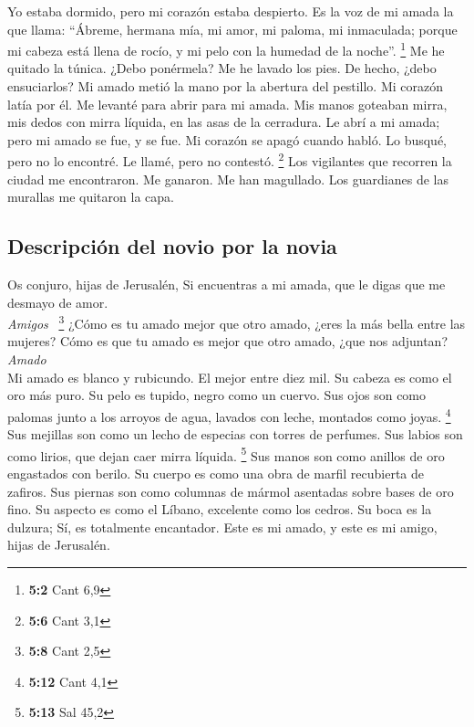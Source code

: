  Yo estaba dormido, pero mi corazón estaba despierto. Es
la voz de mi amada la que llama: ``Ábreme, hermana mía, mi amor, mi
paloma, mi inmaculada; porque mi cabeza está llena de rocío, y mi pelo
con la humedad de la noche''. \footnote{\textbf{5:2} Cant 6,9}
 Me he quitado la túnica. ¿Debo ponérmela? Me he lavado
los pies. De hecho, ¿debo ensuciarlos?  Mi amado metió la
mano por la abertura del pestillo. Mi corazón latía por él.
 Me levanté para abrir para mi amada. Mis manos goteaban
mirra, mis dedos con mirra líquida, en las asas de la cerradura.
 Le abrí a mi amada; pero mi amado se fue, y se fue. Mi
corazón se apagó cuando habló. Lo busqué, pero no lo encontré. Le llamé,
pero no contestó. \footnote{\textbf{5:6} Cant 3,1}  Los
vigilantes que recorren la ciudad me encontraron. Me ganaron. Me han
magullado. Los guardianes de las murallas me quitaron la capa.

\hypertarget{descripciuxf3n-del-novio-por-la-novia}{%
\subsection{Descripción del novio por la
novia}\label{descripciuxf3n-del-novio-por-la-novia}}

 Os conjuro, hijas de Jerusalén, Si encuentras a mi amada,
que le digas que me desmayo de amor.\\
\emph{Amigos} ~\footnote{\textbf{5:8} Cant 2,5}  ¿Cómo es
tu amado mejor que otro amado, ¿eres la más bella entre las mujeres?
Cómo es que tu amado es mejor que otro amado, ¿que nos adjuntan?\\
\emph{Amado}\\
 Mi amado es blanco y rubicundo. El mejor entre diez mil.
 Su cabeza es como el oro más puro. Su pelo es tupido,
negro como un cuervo.  Sus ojos son como palomas junto a
los arroyos de agua, lavados con leche, montados como joyas. \footnote{\textbf{5:12}
  Cant 4,1}  Sus mejillas son como un lecho de especias
con torres de perfumes. Sus labios son como lirios, que dejan caer mirra
líquida. \footnote{\textbf{5:13} Sal 45,2}  Sus manos son
como anillos de oro engastados con berilo. Su cuerpo es como una obra de
marfil recubierta de zafiros.  Sus piernas son como
columnas de mármol asentadas sobre bases de oro fino. Su aspecto es como
el Líbano, excelente como los cedros.  Su boca es la
dulzura; Sí, es totalmente encantador. Este es mi amado, y este es mi
amigo, hijas de Jerusalén.

